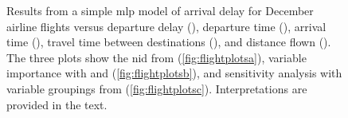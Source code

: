 \documentclass[article,shortnames]{jss}
\begin{document}
\begin{figure}
\centering
{}


\caption{Results from a simple \ac{mlp} model of arrival delay for December airline flights versus departure delay (), departure time (), arrival time (), travel time between destinations (), and distance flown (). The three plots show the \ac{nid} from  (\ref{fig:flightplotsa}), variable importance with  and  (\ref{fig:flightplotsb}), and sensitivity analysis with variable groupings from  (\ref{fig:flightplotsc}). Interpretations are provided in the text.}
\label{fig:flightplots}
\end{figure}
\end{document}
